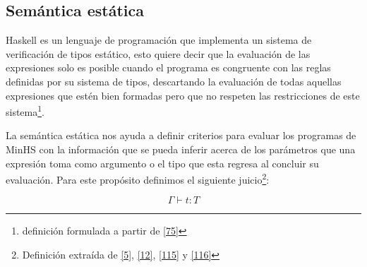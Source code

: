 \subsection{Semántica estática}

    \textsf{Haskell} es un lenguaje de programación que implementa un sistema de verificación de tipos estático, esto quiere decir que la evaluación de las expresiones solo es posible cuando el programa es congruente con las reglas definidas por su sistema de tipos, descartando la evaluación de todas aquellas expresiones que estén bien formadas pero que no respeten las restricciones de este sistema\footnote{definición formulada a partir de \hyperlink{75}{[75]}}. 


    \begin{definition}
       La semántica estática nos ayuda a definir criterios para evaluar los programas de \textsf{MinHS} con la información que se pueda inferir acerca de los parámetros que una expresión toma como argumento o el tipo que esta regresa al concluir su evaluación. Para este propósito definimos el siguiente juicio\footnote{Definición extraída de  \hyperlink{5}{[5]},  \hyperlink{12}{[12]}, \hyperlink{115}{[115]} y \hyperlink{116}{[116]}}:
    
    $$\Gamma\vdash t: T$$
    

\end{definition}
